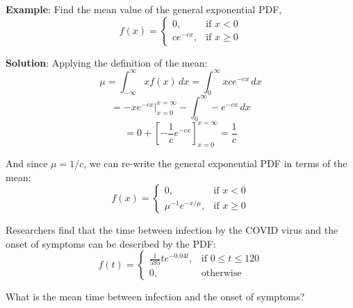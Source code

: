 \textbf{Example}: Find the mean value of the general exponential PDF, 
$$f(x) = 
\begin{cases}
0,&\text{if }x < 0\\
ce^{-cx},&\text{if }x \geq 0
\end{cases}$$

\textbf{Solution}: Applying the definition of the mean:
$$\mu = \int_{-\infty}^{\infty} xf(x)\,dx = \int_0^{\infty} xce^{-cx}\,dx$$
$$= -xe^{-cx}|_{x = 0}^{x = \infty} - \int_0^{\infty} -e^{-cx}\,dx$$
$$= 0 + \left[-\frac{1}{c}e^{-cx} \right]_{x = 0}^{x = \infty} = \frac{1}{c}$$

And since $\mu = 1/c$, we can re-write the general exponential PDF in terms of 
the mean:
$$f(x) = 
\begin{cases}
0,&\text{if }x < 0\\
\mu^{-1}e^{-x/\mu},&\text{if }x \geq 0
\end{cases}$$

\begin{Exercise}[title = {Onset of Symptoms}, label = symptoms]
Researchers find that the time between infection by the COVID virus and the 
onset of symptoms can be described by the PDF:
$$f(t) = 
\begin{cases}
\frac{1}{595} te^{-0.04t},&\text{if }0 \leq t \leq 120\\
0,&\text{otherwise}
\end{cases}$$

What is the mean time between infection and the onset of symptoms?
\vspace{50mm}
\end{Exercise}

